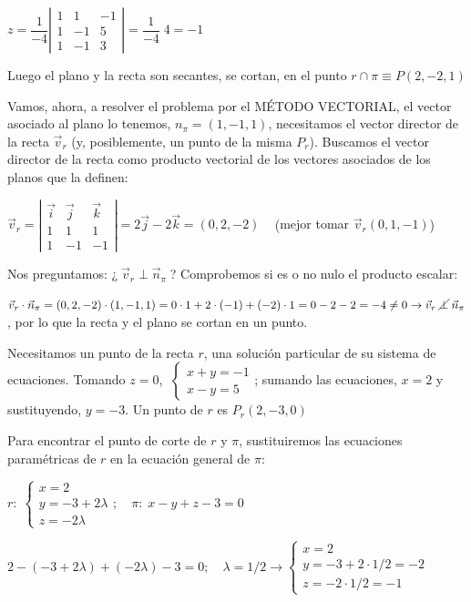 \noindent $z=\dfrac 1 {-4} \left| \begin{matrix} 1&1&-1 \\ 1&-1&5 \\ 1&-1&3\end{matrix} \right|=\dfrac 1 {-4}\; 4=-1 $

\noindent Luego el plano y la recta son secantes, se cortan, en el punto $r\cap \pi \equiv P(2,-2,1)$

\noindent Vamos, ahora, a resolver el problema por el MÉTODO VECTORIAL, el vector asociado al plano lo tenemos, $n_{\pi}=(1,-1,1)$, necesitamos el vector director de la recta $\vec v_r$ (y, posiblemente, un punto de la misma $P_r$). Buscamos el vector director de la recta como producto vectorial de los vectores asociados de los planos que la definen:

\noindent $\vec v_r=\left| \begin{matrix} \vec i&\vec j&\vec k \\ 1&1&1\\1&-1&-1 \end{matrix} \right|=2\vec j-2\vec k=(0,2,-2)\;\;\;$ (\textcolor{gris}{mejor tomar $\vec v_r(0,1,-1)$})

\noindent Nos preguntamos: ¿$\;\vec v_r \;\bot \; \vec n_{\pi}\;$? Comprobemos si es o no nulo el producto escalar: 

\noindent $\vec v_r \cdot \vec n_{\pi}=(0,2,-2)\cdot(1,-1,1)=0\cdot 1+2\cdot (-1)+(-2)\cdot 1=0-2-2=-4 \neq 0 \to  \vec v_r\; \cancel{\bot}\; \vec n_{\pi}$, por lo que la recta y el plano se cortan en un punto.

\noindent Necesitamos un punto de la recta $r$, una solución particular de su sistema de ecuaciones. Tomando $z=0$, \small{$\;\begin{cases} x+y=-1\\x-y=5 \end{cases}$}\normalsize{;} sumando las ecuaciones, $x=2$ y sustituyendo, $y=-3$. Un punto de $r$ es $P_r(2,-3,0)$

\noindent Para encontrar el punto de corte de $r$ y $\pi$, sustituiremos las ecuaciones paramétricas de $r$ en la ecuación general de $\pi$:

\noindent $r:\;\begin{cases} x=2\\y=-3+2\lambda\\z=-2\lambda \end{cases} ;\quad \pi:\; x-y+z-3=0$

\noindent $2-(-3+2\lambda)+(-2\lambda)-3=0; \quad \lambda=1/2 \to \begin{cases} x=2\\y=-3+2\cdot 1/2 =-2\\z=-2 \cdot 1/2 =-1 \end{cases}$
 
